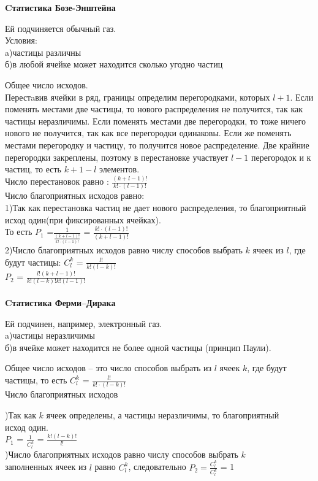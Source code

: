 \documentclass[russian, 12pt, fleqn]{article}
\begin{document}
\textbf{Cтатистика Бозе-Энштейна}
\begin{tabbing}
Ей подчиняется обычный газ.\\
Условия:\\
\qquad a)частицы различны\\
\qquad б)в любой ячейке может находится сколько угодно частиц\\
\end{tabbing}
Общее число исходов.\\
Перестaвив ячейки в ряд, границы определим перегородками, которых $l + 1$. Если поменять местами две частицы, то нового распределения не получится, так как частицы неразличимы. Если поменять местами две перегородки, то тоже ничего нового не получится, так как все перегородки одинаковы. Если же поменять местами перегородку и частицу, то получится новое распределение. Две крайние перегородки закреплены, поэтому в перестановке участвует $ l - 1$ перегородок и к частиц, то есть  $k + 1 - l$ элементов.\\
Число перестановок равно : $\frac{(k + l - 1)!}{k!\cdot (l - 1)!}$\\
Число благоприятных исходов равно:\\
1)Так как перестановка частиц не дает нового распределения, то благоприятный исход один(при фиксированных ячейках).\\
То есть $P_1$ =$\frac{1}{\frac{(k + l - 1)!}{k!\cdot(l-1)!}}$ = $\frac{k!\cdot(l-1)!}{(k + l - 1)!}$\\
2)Число благоприятных исходов равно числу способов выбрать $k$ ячеек из $l$, где будут частицы: $C^k_l$ = $\frac{l!}{k!(l - k)!}$\\
$P_2$ = $\frac{l!(k + l - 1)!}{k!(l - k)!k!(l - 1)!}$ \\
\\
\textbf{Cтатистика Ферми--Дирака}
\begin{tabbing}
Ей подчинен, например, электронный газ.\\
\qquad a)частицы неразличимы\\
\qquad б)в ячейке может находится не более одной частицы (принцип Паули).
\end{tabbing}
Общее число исходов -- это число способов выбрать из $l$ ячеек $k$, где будут частицы, то есть $C^k_l$ = $\frac{l!}{k!\cdot(l - k)!}$\\
Число благоприятных исходов
\begin{tabbing}	
)Так как $k$  ячеек определены, а частицы неразличимы, то благоприятный\\ исход один.\\$P_1$ = $\frac{1}{C^k_l}$ = $\frac{k!(l - k)!}{l!}$\\
)Число благоприятных исходов равно числу способов выбрать $k$\\
 заполненных ячеек из $l$  равно $C^k_l$, следовательно $P_2 = \frac{C^k_l}{C^k_l}$ = 1
\end{tabbing}
\end{document}
